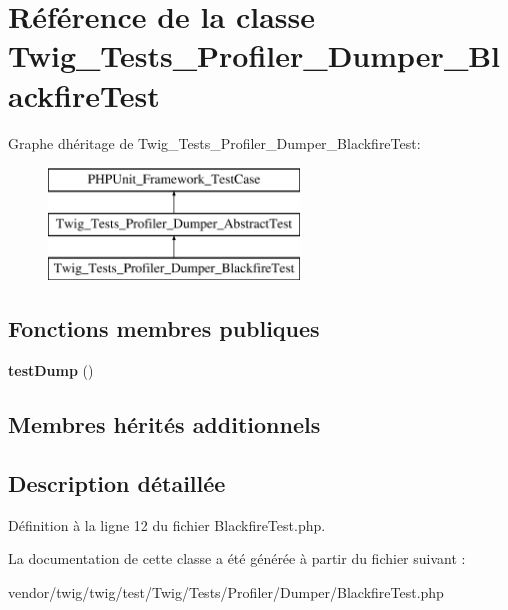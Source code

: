 \hypertarget{class_twig___tests___profiler___dumper___blackfire_test}{}\section{Référence de la classe Twig\+\_\+\+Tests\+\_\+\+Profiler\+\_\+\+Dumper\+\_\+\+Blackfire\+Test}
\label{class_twig___tests___profiler___dumper___blackfire_test}
Graphe d\textquotesingle{}héritage de Twig\+\_\+\+Tests\+\_\+\+Profiler\+\_\+\+Dumper\+\_\+\+Blackfire\+Test\+:\begin{figure}[H]
\begin{center}
\leavevmode
\includegraphics[height=3.000000cm]{class_twig___tests___profiler___dumper___blackfire_test}
\end{center}
\end{figure}
\subsection*{Fonctions membres publiques}
\begin{DoxyCompactItemize}
\item 
{\bfseries test\+Dump} ()\hypertarget{class_twig___tests___profiler___dumper___blackfire_test_a054950b93fb5a74a2d2c89d38f5758ff}{}\label{class_twig___tests___profiler___dumper___blackfire_test_a054950b93fb5a74a2d2c89d38f5758ff}

\end{DoxyCompactItemize}
\subsection*{Membres hérités additionnels}


\subsection{Description détaillée}


Définition à la ligne 12 du fichier Blackfire\+Test.\+php.



La documentation de cette classe a été générée à partir du fichier suivant \+:\begin{DoxyCompactItemize}
\item 
vendor/twig/twig/test/\+Twig/\+Tests/\+Profiler/\+Dumper/Blackfire\+Test.\+php\end{DoxyCompactItemize}
